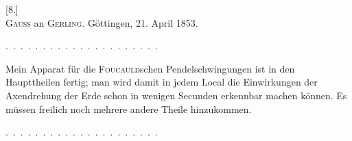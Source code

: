 \clearpage\begingroup{}
\begin{center}
[8.]\\[.7em]
\textsc{Gauss} an \textsc{Gerling}. Göttingen, 21. April 1853.
\end{center}
\noindent .\ .\ .\ .\ .\ .\ .\ .\ .\ .\ .\ .\ .\ .\ .\ .\ .\ .\ .\ .\ .
\par\noindent\hspace*{\parindent}Mein Apparat für die \textsc{Foucauld}schen Pendelschwingungen ist in den
Haupttheilen fertig; man wird damit in jedem Local die Einwirkungen der
Axendrehung der Erde schon in wenigen Secunden erkennbar machen
können. Es müssen freilich noch mehrere andere Theile hinzukommen.
\par\noindent .\ .\ .\ .\ .\ .\ .\ .\ .\ .\ .\ .\ .\ .\ .\ .\ .\ .\ .\ .\ .
\clearpage\endgroup
